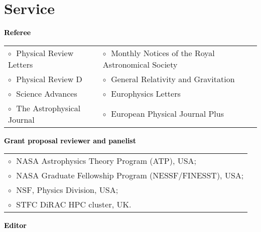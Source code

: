 \documentclass[a4paper]{moderncv}
\begin{document}
\section{Service}

\textbf{\textcolor{black}{Referee}}\vspace{0.1cm}\\
\begin{tabular}{@{\hskip 0.4cm}l@{\hskip 0.4in}l}
$\circ\;$ Physical Review Letters & $\circ\;$ Monthly Notices of the Royal Astronomical Society \\
$\circ\;$ Physical Review D & $\circ\;$ General Relativity and Gravitation \\
$\circ\;$ Science Advances & $\circ\;$ Europhysics Letters \\
$\circ\;$ The Astrophysical Journal &  $\circ\;$ European Physical Journal Plus
\end{tabular}
\vspace{+0.15cm}
 
 \textbf{\textcolor{black}{Grant proposal reviewer and panelist}}\vspace{0.1cm}\\
\begin{tabular}{@{\hskip 0.4cm}l}
$\circ\;$ NASA Astrophysics Theory Program (ATP), USA; \\
$\circ\;$ NASA Graduate Fellowship Program (NESSF/FINESST), USA; \\
$\circ\;$ NSF, Physics Division, USA; \\
$\circ\;$ STFC DiRAC HPC cluster, UK.
\end{tabular}
\vspace{+0.15cm}

 \textbf{\textcolor{black}{Editor}}\vspace{0.1cm}\\
 \vspace{-0.1cm}
\vspace{+0.15cm}
\end{document}
